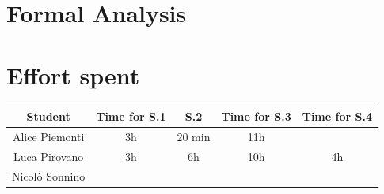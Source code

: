 \documentclass[table, 12pt]{article}
\begin{document}
\begin{flushleft}
    \section{Formal Analysis}
    \newpage
    \section{Effort spent}
    \begin{tabular}{ | c || c | c | c | c|}
        \hline
        Student        & Time for S.1 & S.2    & Time for S.3 & Time for S.4 \\ \hline
        Alice Piemonti & 3h           & 20 min & 11h          &              \\ \hline
        Luca Pirovano  & 3h           & 6h     & 10h          & 4h           \\ \hline
        Nicolò Sonnino &              &        &              &              \\
        \hline
    \end{tabular}
\end{flushleft}
\end{document}
